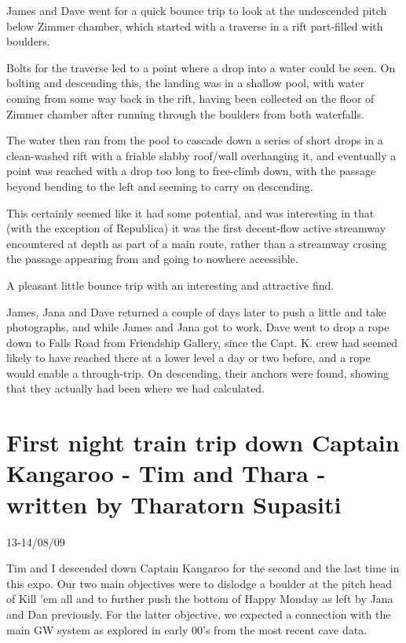 James and Dave went for a quick bounce trip to look at the undescended
pitch below Zimmer chamber, which started with a traverse in a rift
part-filled with boulders.

Bolts for the traverse led to a point where a drop into a water could be
seen. On bolting and descending this, the landing was in a shallow pool,
with water coming from some way back in the rift, having been collected
on the floor of Zimmer chamber after running through the boulders from
both waterfalls.

The water then ran from the pool to cascade down a series of short drops
in a clean-washed rift with a friable slabby roof/wall overhanging it,
and eventually a point was reached with a drop too long to free-climb
down, with the passage beyond bending to the left and seeming to carry
on descending.

This certainly seemed like it had some potential, and was interesting in
that (with the exception of Republica) it was the first decent-flow
active streamway encountered at depth as part of a main route, rather
than a streamway crosing the passage appearing from and going to nowhere
accessible.

A pleasant little bounce trip with an interesting and attractive find.

James, Jana and Dave returned a couple of days later to push a little
and take photographs, and while James and Jana got to work, Dave went to
drop a rope down to Falls Road from Friendship Gallery, since the Capt.
K. crew had seemed likely to have reached there at a lower level a day
or two before, and a rope would enable a through-trip. On descending,
their anchors were found, showing that they actually had been where we
had calculated.


\hypertarget{first-night-train-trip-down-captain-kangaroo---tim-and-thara---written-by-tharatorn-supasiti}{%
\section{First night train trip down Captain Kangaroo - Tim and Thara -
written by Tharatorn
Supasiti}\label{first-night-train-trip-down-captain-kangaroo---tim-and-thara---written-by-tharatorn-supasiti}}

13-14/08/09

Tim and I descended down Captain Kangaroo for the second and the last
time in this expo. Our two main objectives were to dislodge a boulder at
the pitch head of Kill 'em all and to further push the bottom of Happy
Monday as left by Jana and Dan previously. For the latter objective, we
expected a connection with the main GW system as explored in early 00's
from the most recent cave data.


